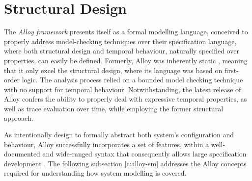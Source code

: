 % 
% 
% 
% 

\section{Structural Design}

The \textit{Alloy framework} presents itself as a formal modelling language, conceived to properly address model-checking techniques over their specification language, where both structural design and temporal behaviour, naturally specified over properties, can easily be defined. Formerly, Alloy was inherently static \cite{lwspecification}, meaning that it only excel the structural design, where its language was based on first-order logic. The analysis process relied on a bounded model checking technique with no support for temporal behaviour. Notwithstanding, the latest release of Alloy confers the ability to properly deal with expressive temporal properties, as well as trace evaluation over time, while employing the former structural approach. 

As intentionally design to formally abstract both system's configuration and behaviour, Alloy successfully incorporates a set of features, within a well-documented and wide-ranged syntax that consequently allows large specification development \cite{lwspecification}. The following subsection \ref{c:alloy-sm} addresses the Alloy concepts required for understanding how system modelling is covered. 


